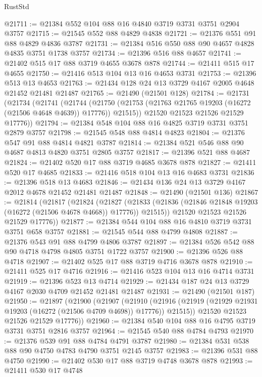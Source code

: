 \begin{lexlean}{RustStd}
\begin{coremodule}
@21711 := @21384 @552 @104 @88 @16 @4840 @3719 @3731 @3751 @2904 @3757
@21715 := @21545 @552 @88 @4829 @4838
@21721 := @21376 @551 @91 @88 @4829 @4836 @3787
@21731 := @21384 @516 @550 @88 @90 @4657 @4828 @4835 @3751 @1738 @3757
@21734 := @21396 @516 @88 @4657
@21741 := @21402 @515 @17 @88 @3719 @4655 @3678 @878
@21744 := @21411 @515 @17 @4655
@21750 := @21416 @513 @104 @13 @16 @4653 @3731
@21753 := @21396 @513 @13 @4653
@21763 := @21434 @128 @24 @13 @3729 @4167 @2005 @4648 @21452 @21481 @21487
@21765 := @21490 (@21501 @128)
@21784 := @21731
    (@21734
      (@21741
        (@21744
          (@21750 (@21753 (@21763 @21765 @19203 (@16272 (@21506 @4648 @4639)) @17776)) @21515))
        @21520
        @21523
        @21526
        @21529
        @17776))
@21794 := @21384 @548 @104 @88 @16 @4825 @3719 @3731 @3751 @2879 @3757
@21798 := @21545 @548 @88 @4814 @4823
@21804 := @21376 @547 @91 @88 @4814 @4821 @3787
@21814 := @21384 @521 @546 @88 @90 @4687 @4813 @4820 @3751 @2805 @3757
@21817 := @21396 @521 @88 @4687
@21824 := @21402 @520 @17 @88 @3719 @4685 @3678 @878
@21827 := @21411 @520 @17 @4685
@21833 := @21416 @518 @104 @13 @16 @4683 @3731
@21836 := @21396 @518 @13 @4683
@21846 := @21434 @136 @24 @13 @3729 @4167 @2012 @4678 @21452 @21481 @21487
@21848 := @21490 (@21501 @136)
@21867 := @21814
    (@21817
      (@21824
        (@21827
          (@21833 (@21836 (@21846 @21848 @19203 (@16272 (@21506 @4678 @4668)) @17776)) @21515))
        @21520
        @21523
        @21526
        @21529
        @17776))
@21877 := @21384 @544 @104 @88 @16 @4810 @3719 @3731 @3751 @658 @3757
@21881 := @21545 @544 @88 @4799 @4808
@21887 := @21376 @543 @91 @88 @4799 @4806 @3787
@21897 := @21384 @526 @542 @88 @90 @4718 @4798 @4805 @3751 @1722 @3757
@21900 := @21396 @526 @88 @4718
@21907 := @21402 @525 @17 @88 @3719 @4716 @3678 @878
@21910 := @21411 @525 @17 @4716
@21916 := @21416 @523 @104 @13 @16 @4714 @3731
@21919 := @21396 @523 @13 @4714
@21929 := @21434 @187 @24 @13 @3729 @4167 @2030 @4709 @21452 @21481 @21487
@21931 := @21490 (@21501 @187)
@21950 := @21897
    (@21900
      (@21907
        (@21910
          (@21916 (@21919 (@21929 @21931 @19203 (@16272 (@21506 @4709 @4698)) @17776)) @21515))
        @21520
        @21523
        @21526
        @21529
        @17776))
@21960 := @21384 @540 @104 @88 @16 @4795 @3719 @3731 @3751 @2816 @3757
@21964 := @21545 @540 @88 @4784 @4793
@21970 := @21376 @539 @91 @88 @4784 @4791 @3787
@21980 := @21384 @531 @538 @88 @90 @4750 @4783 @4790 @3751 @2145 @3757
@21983 := @21396 @531 @88 @4750
@21990 := @21402 @530 @17 @88 @3719 @4748 @3678 @878
@21993 := @21411 @530 @17 @4748

\end{coremodule}
\end{lexlean}
